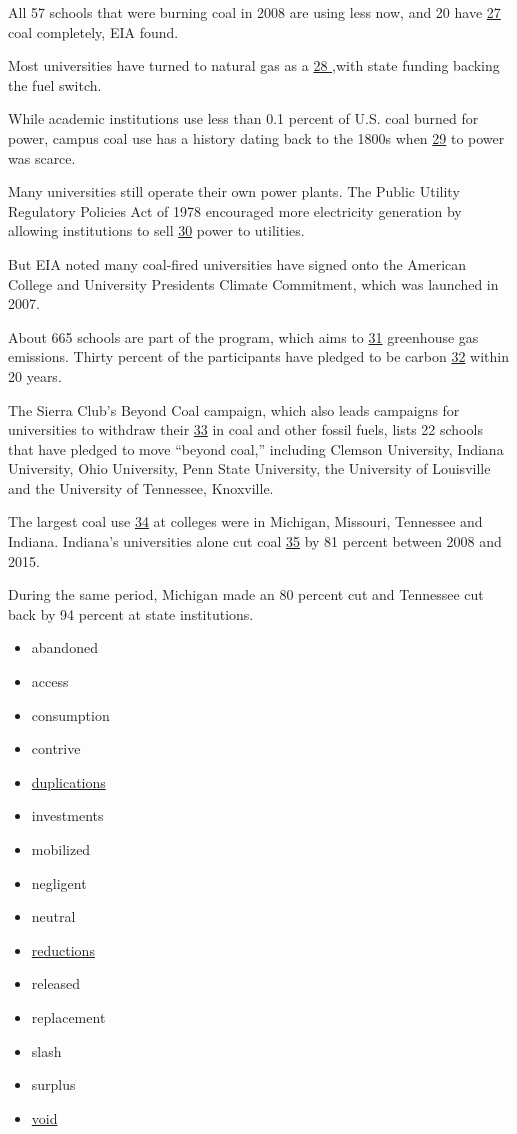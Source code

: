 \documentclass[UTF8,11pt]{ctexart}
\begin{document}
All 57 schools that were burning coal in 2008 are using less now, and 20 have \uline{27} coal completely, EIA found.


Most universities have turned to natural gas as a \uline{28 },with state funding backing the fuel switch.


While academic institutions use less than 0.1 percent of U.S. coal burned for power, campus coal use has a history dating back to the 1800s when \uline{29} to power was scarce.


Many universities still operate their own power plants. The Public Utility Regulatory Policies Act of 1978 encouraged more electricity generation by allowing institutions to sell \uline{30} power to utilities.


But EIA noted many coal-fired universities have signed onto the American College and University Presidents Climate Commitment, which was launched in 2007.


About 665 schools are part of the program, which aims to \uline{31} greenhouse gas emissions. Thirty percent of the participants have pledged to be carbon \uline{32} within 20 years.


The Sierra Club’s Beyond Coal campaign, which also leads campaigns for universities to withdraw their \uline{33} in coal and other fossil fuels, lists 22 schools that have pledged to move “beyond coal,” including Clemson University, Indiana University, Ohio University, Penn State University, the University of Louisville and the University of Tennessee, Knoxville.


The largest coal use \uline{34} at colleges were in Michigan, Missouri, Tennessee and Indiana. Indiana’s universities alone cut coal \uline{35} by 81 percent between 2008 and 2015.


During the same period, Michigan made an 80 percent cut and Tennessee cut back by 94 percent at state institutions.


\begin{itemize}[leftmargin=2em,itemsep=.2em,topsep=.4em]\item[A.] abandoned
\item[B.] access
\item[C.] consumption
\item[D.] contrive
\item[E.] \uline{duplications}
\item[F.] investments
\item[G.] mobilized
\item[H.] negligent
\item[I.] neutral
\item[J.] \uline{reductions}
\item[K.] released
\item[L.] replacement
\item[M.] slash
\item[N.] surplus
\item[O.] \uline{void}
\end{itemize}
\end{document}
